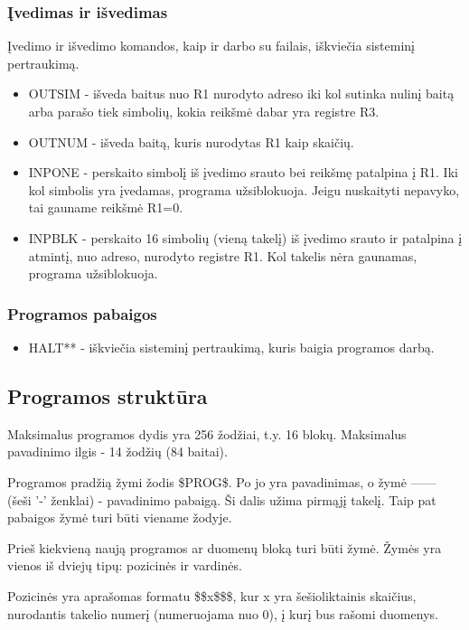 \documentclass{VUMIFInfKursinis}
\begin{document}
\subsubsection{Įvedimas ir išvedimas}
Įvedimo ir išvedimo komandos, kaip ir darbo su failais, iškviečia sisteminį pertraukimą. 
\begin{itemize}
	\item OUTSIM - išveda baitus nuo R1 nurodyto adreso iki kol sutinka nulinį baitą arba parašo tiek simbolių, kokia reikšmė dabar yra registre R3.
	\item OUTNUM - išveda baitą, kuris nurodytas R1 kaip skaičių.
	\item INPONE - perskaito simbolį iš įvedimo srauto bei reikšmę patalpina į R1. Iki kol simbolis yra įvedamas, programa užsiblokuoja. Jeigu nuskaityti nepavyko, tai gauname reikšmė R1=0.
	\item INPBLK - perskaito 16 simbolių (vieną takelį) iš įvedimo srauto ir patalpina į atmintį, nuo adreso, nurodyto registre R1. Kol takelis nėra gaunamas, programa užsiblokuoja.
\end{itemize}

\subsubsection{Programos pabaigos}
\begin{itemize}
	\item HALT** - iškviečia sisteminį pertraukimą, kuris baigia programos darbą.
\end{itemize}

\subsection{Programos struktūra}

Maksimalus programos dydis yra 256 žodžiai, t.y. 16 blokų. Maksimalus pavadinimo ilgis - 14 žodžių (84 baitai).

Programos pradžią žymi žodis \$PROG\$. Po jo yra pavadinimas, o žymė ------ (šeši '-' ženklai) - pavadinimo pabaigą. Ši dalis užima pirmąjį takelį. Taip pat pabaigos žymė turi būti viename žodyje.

Prieš kiekvieną naują programos ar duomenų bloką turi būti žymė. Žymės yra vienos iš dviejų tipų: pozicinės ir vardinės.

Pozicinės yra aprašomas formatu \$\$x\$\$\$, kur x yra šešioliktainis skaičius, nurodantis takelio numerį (numeruojama nuo 0), į kurį bus rašomi duomenys.
\end{document}
